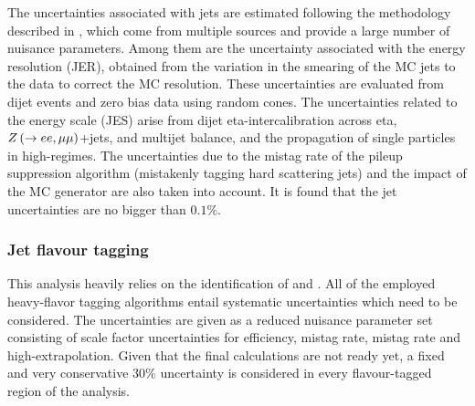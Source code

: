The uncertainties associated with jets are estimated following the methodology described in , which come from multiple sources and provide a large number of nuisance parameters.
Among them are the uncertainty associated with the energy resolution (JER), obtained from the variation in the smearing of the \ac{MC} jets to the data to correct the \ac{MC} resolution. These uncertainties are evaluated from dijet events and zero bias data using random cones. 
The uncertainties related to the energy scale (JES) arise from dijet eta-intercalibration across eta, \(Z\left(\rightarrow ee, \mu\mu\right)\)+jets, \gammajet and multijet balance, and the propagation of single particles in high-\pt regimes.
The uncertainties due to the mistag rate of the pileup suppression algorithm (mistakenly tagging hard scattering jets) and the impact of the MC generator are also taken into account.
It is found that the jet uncertainties are no bigger than \(0.1\%\).




\subsubsection{Jet flavour tagging}

This analysis heavily relies on the identification of \bjets and \cjets. All of the employed heavy-flavor tagging algorithms entail systematic uncertainties which need to be considered. The \btagging uncertainties are given as a reduced nuisance parameter set consisting of scale factor uncertainties for \btagging efficiency, \cjet mistag rate, \ljet mistag rate and high-\pt extrapolation. Given that the final calculations are not ready yet, a fixed and very conservative \(30\%\) uncertainty is considered in every flavour-tagged region of the analysis.




